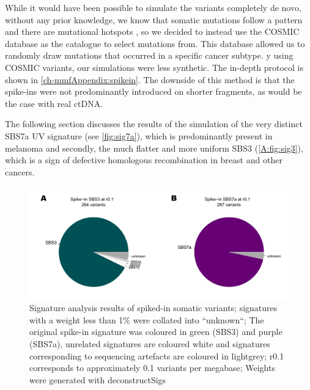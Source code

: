 While it would have been possible to simulate the variants completely de novo, without any prior knowledge, we know that somatic mutations follow a  pattern and there are mutational hotspots \cite{Chen2016,Moore2021}, so we decided to instead use the COSMIC database \cite{Tate2018,WSI2021} as the catalogue to select mutations from. This database allowed us to randomly draw mutations that occurred in a specific cancer subtype. y using COSMIC variants, our simulations were less synthetic. The in-depth protocol is shown in \autoref{ch-mmfAppendix:spikein}. The downside of this method is that the spike-ins were not predominantly introduced on shorter fragments, as would be the case with real ctDNA. 

The following section discusses the results of the simulation of the very distinct SBS7a UV signature (see \autoref{fig:sig7a}), which is predominantly present in melanoma and secondly, the much flatter and more uniform SBS3 (\autoref{A:fig:sig3}), which is a sign of defective homologous recombination in breast and other cancers. 


\begin{figure}[ht]
\centering
\includegraphics[width=.9\linewidth]{Figures/MisMatchFinder/spikeInSanityCheck.pdf}
\caption[Signature analysis of spike-in somatic variants]{Signature analysis results of spiked-in somatic variants; signatures with a weight less than 1\% were collated into ``unknown``; The original spike-in signature was coloured in green (SBS3) and purple (SBS7a), unrelated signatures are coloured white and signatures corresponding to sequencing artefacts are coloured in lightgrey; r0.1 corresponds to approximately 0.1 variants per megabase; Weights were generated with deconstructSigs \cite{Rosenthal2016} }\label{fig:mmf-spikeinsanity}
\end{figure}

